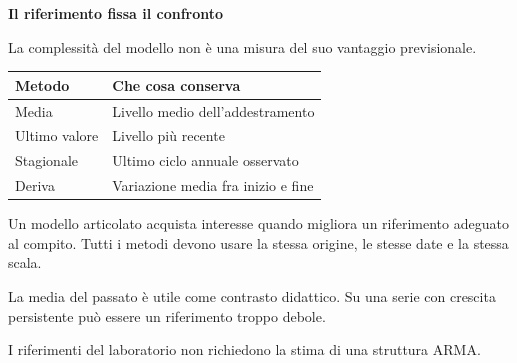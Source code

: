 \documentclass[12pt,aspectratio=1610]{beamer}
\newcommand{\PBody}[1]{\par{\fontsize{11.3}{14.8}\selectfont #1\par}}
\newcommand{\PSmall}[1]{\par{\fontsize{9.8}{13.1}\selectfont #1\par}}
\newcommand{\PInfo}[1]{%
\begin{tcolorbox}[enhanced,arc=1.6mm,boxrule=.55pt,colback=GeoTint,
 colframe=Rule!80!Classical,left=2.3mm,right=2.3mm,top=2mm,bottom=2mm,
 before skip=1mm,after skip=1mm]
\PSmall{#1}\end{tcolorbox}}
\begin{document}
\begin{frame}[plain]\hypertarget{slide11}{}
\begin{lrbox}{\TitleBox}
\begin{minipage}[t]{17.7cm}\raggedright\color{Ink}\fontsize{11.3}{14.8}\selectfont
\color{Navy}\bfseries\fontsize{20.6}{24.5}\selectfont Il riferimento fissa il confronto
\end{minipage}\end{lrbox}

\begin{lrbox}{\RecallBox}
\begin{minipage}[t]{14.3cm}\raggedright\color{Ink}\fontsize{11.3}{14.8}\selectfont
\fontsize{10.3}{13.8}\selectfont La complessità del modello non è una misura del suo vantaggio previsionale.
\end{minipage}\end{lrbox}

\begin{lrbox}{\PilotLeftBox}
\begin{minipage}[t]{10.05cm}\raggedright\color{Ink}\fontsize{11.3}{14.8}\selectfont
{\fontsize{10.2}{13.1}\selectfont\renewcommand{\arraystretch}{1.45}\begin{tabular}{@{}p{3.0cm}p{6.0cm}@{}}\toprule
\textbf{Metodo} & \textbf{Che cosa conserva}\\\midrule
Media & Livello medio dell’addestramento\\
Ultimo valore & Livello più recente\\
Stagionale & Ultimo ciclo annuale osservato\\
Deriva & Variazione media fra inizio e fine\\
\bottomrule\end{tabular}}

\end{minipage}\end{lrbox}

\begin{lrbox}{\PilotRightBox}
\begin{minipage}[t]{7.55cm}\raggedright\color{Ink}\fontsize{11.3}{14.8}\selectfont
\PBody{Un modello articolato acquista interesse quando migliora un riferimento adeguato al compito. Tutti i metodi devono usare la stessa origine, le stesse date e la stessa scala.}
\vspace{2.5mm}
\PInfo{La media del passato è utile come contrasto didattico. Su una serie con crescita persistente può essere un riferimento troppo debole.}
\PBody{I riferimenti del laboratorio non richiedono la stima di una struttura ARMA.}
\vspace{2.5mm}


\end{minipage}
\end{lrbox}
\end{frame}
\end{document}
